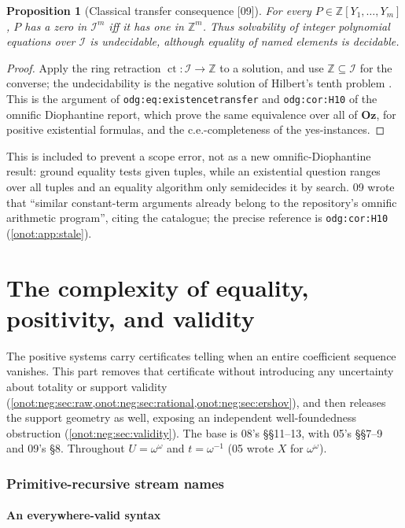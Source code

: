 \documentclass[11pt,oneside]{article}
\numberwithin{equation}{section}
\newtheorem{proposition}[proposition]{Proposition}
\theoremstyle{definition}
\theoremstyle{remark}
\newcommand{\Oz}{\mathbf{Oz}}
\newcommand{\Z}{\mathbb Z}
\newcommand{\IO}{\mathcal I}
\newcommand{\ct}{\operatorname{ct}}
\newcommand{\src}[1]{\textup{\textsf{\small[#1]}}}
\newcommand{\replabel}[1]{\nolinkurl{#1}}
\begin{document}
\begin{proposition}[Classical transfer consequence \src{09}]\label{onot:grid:prop:diophantine}
For every $P\in\Z[Y_1,\ldots,Y_m]$, $P$ has a zero in $\IO^m$ iff it has one in
$\Z^m$. Thus solvability of integer polynomial equations over $\IO$ is
undecidable, although equality of named elements is decidable.
\end{proposition}
\begin{proof}
Apply the ring retraction $\ct:\IO\to\Z$ to a solution, and use $\Z\subseteq\IO$
for the converse; the undecidability is the negative solution of Hilbert's tenth
problem \cite{Matiyasevich}. This is the argument of \replabel{odg:eq:existencetransfer}
and \replabel{odg:cor:H10} of the omnific Diophantine report, which prove the same
equivalence over all of $\Oz$, for positive existential formulas, and the
c.e.-completeness of the yes-instances.
\end{proof}
This is included to prevent a scope error, not as a new omnific-Diophantine
result: ground equality tests given tuples, while an existential question ranges
over all tuples and an equality algorithm only semidecides it by search. 09 wrote
that ``similar constant-term arguments already belong to the repository's omnific
arithmetic program'', citing the catalogue; the precise reference is
\replabel{odg:cor:H10} (\cref{onot:app:stale}).

\part{The complexity of equality, positivity, and validity}\label{onot:neg:part}

The positive systems carry certificates telling when an entire coefficient
sequence vanishes. This part removes that certificate without introducing any
uncertainty about totality or support validity (\cref{onot:neg:sec:raw,onot:neg:sec:rational,onot:neg:sec:ershov}),
and then releases the support geometry as well, exposing an independent
well-foundedness obstruction (\cref{onot:neg:sec:validity}). The base is 08's
\S\S11--13, with 05's \S\S7--9 and 09's \S8. Throughout $U=\omega^\omega$ and
$t=\omega^{-1}$ (05 wrote $X$ for $\omega^\omega$).

\section{Primitive-recursive stream names}\label{onot:neg:sec:raw}

\subsection{An everywhere-valid syntax}
\end{document}
